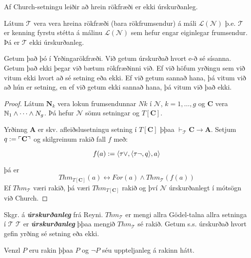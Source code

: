 \documentclass[12pt]{book}
\newcommand{\cT}{\mathcal{T}}
\newcommand{\cL}{\mathcal{L}}
\newcommand{\cN}{\mathcal{N}}
\newcommand{\mb}[1]{\mathbf{#1}}
\newcommand{\bA}{\mathbf{A}}
\newcommand{\bC}{\mathbf{C}}
\newcommand{\vT}{\vdash_{\cT}}
\newcommand{\thT}{Thm_{\cT}}
\newcommand{\emphs}[1]{\textbf{\emph{#1}}}
\DeclarePairedDelimiter{\god}{\ulcorner}{\urcorner}
\begin{document}
Af Church-setningu leiðir að  hrein rökfræði er ekki úrskurðanleg.

\begin{setn}
  Látum $\cT$ vera  vera hreina rökfræði (bara rökfrumsendur)
  á máli $\cL(\cN)$ þ.e.
  $\cT$ er kenning fyrstu stétta á málinu $\cL(\cN)$ sem hefur engar
  eiginlegar frumsendur. Þá er $\cT$ ekki úrskurðanleg.
\end{setn}

\begin{innsk}
  Getum það þó í Yrðingarökfræði. Við getum úrskurðað hvort e-ð sé
  sísanna.
  Getum það ekki þegar við bætum rökfræðinni við.
  Ef við höfum yrðingu sem við vitum ekki hvort að sé setning eða
  ekki.  Ef við getum sannað hana, þá vitum við að hún er setning, en
  ef við getum ekki sannað hana, þá vitum við það ekki.
\end{innsk}

\begin{proof}
  Látum $\mb{N}_k$ vera lokun frumsendunnar
  $Nk$ í $\cN$, $k = 1, \dotsc, g$ og $\bC$ vera
  $\mathbb{N}_1 \wedge \dotsb \wedge N_g$.
  Þá hefur $\cN$ sömu setningar og $T[\bC]$.


  Yrðinng $\bA$ er skv. afleiðslusetningu setning í
  $T[\bC]$ þþaa $\vT \bC \to \bA$.
  Setjum $q := \god{\bC}$ og skilgreinum rakið fall $f$ með:

  \[ f(a) := \langle\tau{\vee},\langle\tau{\lnot},q\rangle,a\rangle \]

  þá er 
  \[ Thm_{T[\bC]} (a) \leftrightarrow For(a) \wedge \thT(f(a)) \]
  Ef $\thT$ væri rakið, þá væri $Thm_{T[\bC]}$ rakið og því
  $\cN$ úrskurðanlegt í mótsögn við Church.

\end{proof}

\begin{skgr}
  Skgr. á \emphs{úrskurðanleg} frá Reyni.
  $Thm_{\cT}$ er mengi allra Gödel-talna allra setninga í $\cT$
  $\cT$ er \emphs{úrskurðanleg} þþaa mengið $Thm_{\cT}$ sé rakið.
  Getum s.s. úrskurðað hvort gefin yrðing sé setning eða ekki.
\end{skgr}


\begin{setn}
  Venzl $P$ eru rakin þþaa  $P$ og $\lnot P$ séu uppteljanleg á
  rakinn hátt.
\end{setn}
\end{document}
